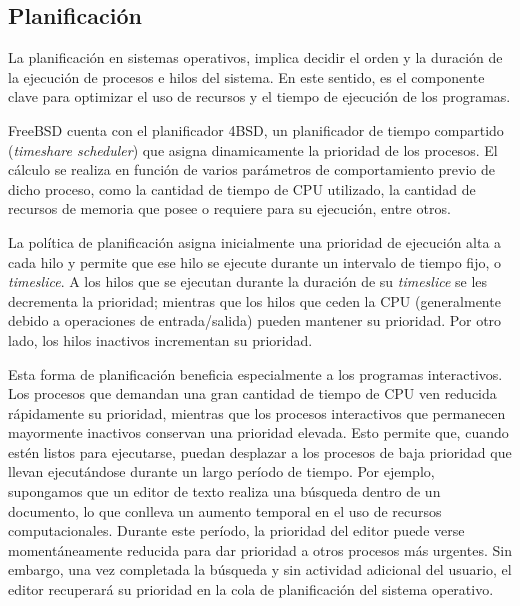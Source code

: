 \subsection{Planificación}

La planificación en sistemas operativos, implica decidir el orden y la duración de la ejecución de procesos e hilos del sistema. En este sentido, es el componente clave para optimizar el uso de recursos y el tiempo de ejecución de los programas.\par

FreeBSD cuenta con el planificador 4BSD, un planificador de tiempo compartido (\textit{timeshare scheduler}) que asigna dinamicamente la prioridad de los procesos. El cálculo se realiza en función de varios parámetros de comportamiento previo de dicho proceso, como la cantidad de tiempo de CPU utilizado, la cantidad de recursos de memoria que posee o requiere para su ejecución, entre otros.\par

La política de planificación asigna inicialmente una prioridad de ejecución alta a cada hilo y permite que ese hilo se ejecute durante un intervalo de tiempo fijo, o \textit{timeslice}. A los hilos que se ejecutan durante la duración de su \textit{timeslice} se les decrementa la prioridad; mientras que los hilos que ceden la CPU (generalmente debido a operaciones de entrada/salida) pueden mantener su prioridad. Por otro lado, los hilos inactivos incrementan su prioridad.\par

Esta forma de planificación beneficia especialmente a los programas interactivos. Los procesos que demandan una gran cantidad de tiempo de CPU ven reducida rápidamente su prioridad, mientras que los procesos interactivos que permanecen mayormente inactivos conservan una prioridad elevada. Esto permite que, cuando estén listos para ejecutarse, puedan desplazar a los procesos de baja prioridad que llevan ejecutándose durante un largo período de tiempo. Por ejemplo, supongamos que un editor de texto realiza una búsqueda dentro de un documento, lo que conlleva un aumento temporal en el uso de recursos computacionales. Durante este período, la prioridad del editor puede verse momentáneamente reducida para dar prioridad a otros procesos más urgentes. Sin embargo, una vez completada la búsqueda y sin actividad adicional del usuario, el editor recuperará su prioridad en la cola de planificación del sistema operativo.\par

